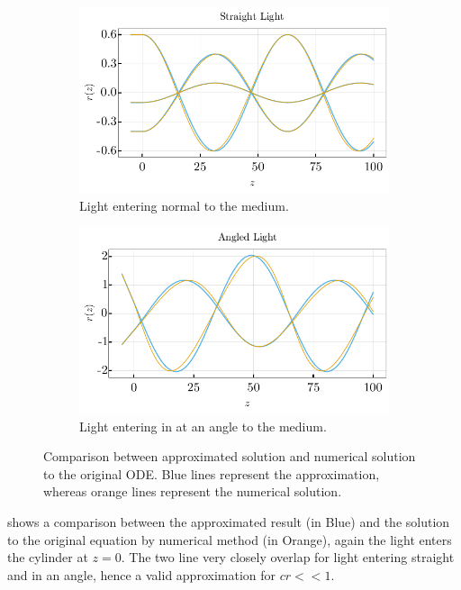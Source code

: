 \documentclass[%
 amsmath,amssymb,
aps,
 fleqn,
 notitlepage,
]{revtex4-2}
\begin{document}
\begin{figure}
    \begin{subfigure}{.5\textwidth}
      \includegraphics[width=.9\linewidth]{ray_comp.pdf}
      \caption{Light entering normal to the medium.}
    \end{subfigure}%
    \begin{subfigure}{.5\textwidth}
      \includegraphics[width=.9\linewidth]{ray_comp_angled.pdf}
      \caption{Light entering in at an angle to the medium.}
    \end{subfigure}
    \caption{Comparison between approximated solution and numerical solution to the original ODE.  Blue lines represent the approximation, whereas orange lines represent the numerical solution.}
    \label{fig: anal_sim}
\end{figure}



 shows a comparison between the approximated result (in Blue) and the solution to the original equation by numerical method (in Orange), again the light enters the cylinder at $z=0$. The two line very closely overlap for light entering straight and in an angle, hence a valid approximation for $cr << 1$.
\end{document}
